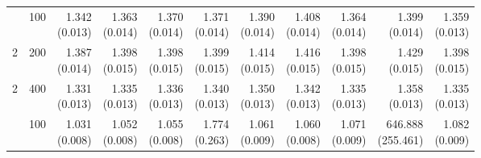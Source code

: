 \begin{table}[p]
{\begin{tabular}{llrrrrrrrrr}
\addlinespace
2 & 100 & \shortstack{1.342\\(0.013)} & \shortstack{1.363\\(0.014)} & \shortstack{1.370\\(0.014)} & \shortstack{1.371\\(0.014)} & \shortstack{1.390\\(0.014)} & \shortstack{1.408\\(0.014)} & \shortstack{1.364\\(0.014)} & \shortstack{1.399\\(0.014)} & \shortstack{1.359\\(0.013)} \\
2 & 200 & \shortstack{1.387\\(0.014)} & \shortstack{1.398\\(0.015)} & \shortstack{1.398\\(0.015)} & \shortstack{1.399\\(0.015)} & \shortstack{1.414\\(0.015)} & \shortstack{1.416\\(0.015)} & \shortstack{1.398\\(0.015)} & \shortstack{1.429\\(0.015)} & \shortstack{1.398\\(0.015)} \\
2 & 400 & \shortstack{1.331\\(0.013)} & \shortstack{1.335\\(0.013)} & \shortstack{1.336\\(0.013)} & \shortstack{1.340\\(0.013)} & \shortstack{1.350\\(0.013)} & \shortstack{1.342\\(0.013)} & \shortstack{1.335\\(0.013)} & \shortstack{1.358\\(0.013)} & \shortstack{1.335\\(0.013)} \\
\addlinespace
3 & 100 & \shortstack{1.031\\(0.008)} & \shortstack{1.052\\(0.008)} & \shortstack{1.055\\(0.008)} & \shortstack{1.774\\(0.263)} & \shortstack{1.061\\(0.009)} & \shortstack{1.060\\(0.008)} & \shortstack{1.071\\(0.009)} & \shortstack{646.888\\(255.461)} & \shortstack{1.082\\(0.009)} \\

\end{tabular}}
\end{table}
